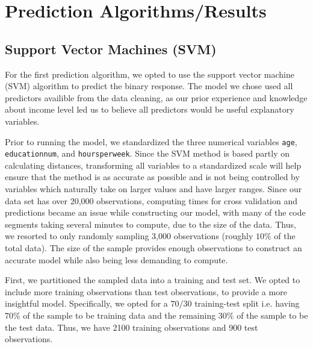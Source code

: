 \documentclass{article}
\begin{document}
\section{Prediction Algorithms/Results}
    \subsection{Support Vector Machines (SVM)}   

    For the first prediction algorithm, we opted to use the support vector machine (SVM) algorithm to predict the binary response. The model we chose used all predictors availible from the data cleaning, as our prior experience and knowledge about income level led us to believe all predictors would be useful explanatory variables. 
    
    Prior to running the model, we standardized the three numerical variables \texttt{age}, \texttt{educationnum}, and \texttt{hoursperweek}. Since the SVM method is based partly on calculating distances, transforming all variables to a standardized scale will help ensure that the method is as accurate as possible and is not being controlled by variables which naturally take on larger values and have larger ranges. Since our data set has over 20,000 observations, computing times for cross validation and predictions became an issue while constructing our model, with many of the code segments taking several minutes to compute, due to the size of the data. Thus, we resorted to only randomly sampling 3,000 observations (roughly $10\%$ of the total data). The size of the sample provides enough observations to construct an accurate model while also being less demanding to compute.  \par 
    
    First, we partitioned the sampled data into a training and test set. We opted to include more training observations than test observations, to provide a more insightful model. Specifically, we opted for a $70/30$ training-test split i.e. having $70\%$ of the sample to be training data and the remaining $30\%$ of the sample to be the test data. Thus, we have 2100 training observations and 900 test observations. \par 
    
\end{document}
